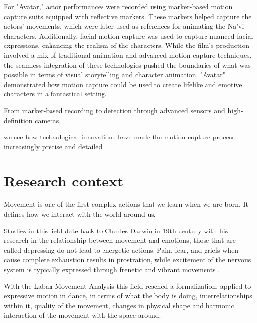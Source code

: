 For "Avatar," actor performances were recorded using marker-based motion capture suits equipped with reflective markers. 
These markers helped capture the actors' movements, which were later used as references for animating the Na'vi characters. 
Additionally, facial motion capture was used to capture nuanced facial expressions, enhancing the realism of the characters.
While the film's production involved a mix of traditional animation and advanced motion capture techniques, 
the seamless integration of these technologies pushed the boundaries of what was possible in terms of visual storytelling 
and character animation. "Avatar" demonstrated how motion capture could be used to 
create lifelike and emotive characters in a fantastical setting.

From marker-based recording to detection through advanced sensors and high-definition cameras,







we see how technological innovations have made the motion capture process increasingly precise and detailed.

\section{Research context}
Movement is one of the first complex actions that we learn when we are born. 
It defines how we interact with the world around us. 

Studies in this field date back to Charles Darwin in 19th century with his research in the relationship 
between movement and emotions, those that are called depressing do not lead to energetic actions. 
Pain, fear, and griefs when cause complete exhaustion results in prostration, 
while excitement of the nervous system is typically expressed through frenetic and vibrant movements \cite{darwin}.  

With the Laban Movement Analysis this field reached a formalization, applied to expressive motion in dance, 
in terms of what the body is doing, interrelationships within it, quality of the movement, 
changes in physical shape and harmonic interaction of the movement with the space around. 

